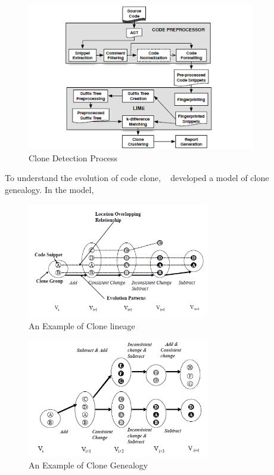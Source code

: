 \documentclass{acm_proc_article-sp}
\begin{document}
 \begin{figure}[h]
 \centering
\includegraphics[width=10cm]{clone_detection}
\caption{Clone Detection Process}
    \label{fig:detect}
\end{figure}

To understand the evolution of code clone, ~\cite{empirical} developed a model of clone genealogy. In the model, 

 \begin{figure}[h]
 \centering
\includegraphics[width=8cm]{lineage}
\caption{An Example of Clone lineage}
    \label{fig:linea}
\end{figure}

 \begin{figure}[h]
 \centering
\includegraphics[width=8cm]{genealogy}
\caption{An Example of Clone Genealogy}
    \label{fig:genea}
\end{figure}
\end{document}

